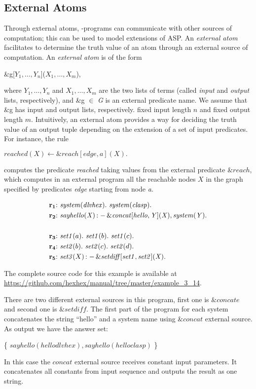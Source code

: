 \documentclass[a4paper, titlepage]{article}
\newcommand{\ext}[3]{\ensuremath{\&{#1}[#2](#3)}}
\DeclareMathOperator{\leftimpl}{:-}
\newcommand{\examplelink}[1]{\url{https://github.com/hexhex/manual/tree/master/#1}}
\newcommand\mycenterline[1]{\par\smallskip\centerline{#1} \smallskip}
\newcommand{\rowprefix}[1]{%
  \ensuremath{\color{black}\mathbf{#1{:}}\ }%
}
\begin{document}
\subsection{External Atoms}
\label{extatoms}
Through external atoms, \hex{}-programs can communicate 
with other sources of computation; this can be used to 
model extensions of ASP.  
An \emph{external atom} facilitates to determine the truth 
value of an atom through an external source of computation.
An \emph{external atom} is of the form
%
\mycenterline{ 
\&g[$Y_1,\dots,Y_n$]($X_1,\dots,X_m$),}
%
where $Y_1,
\dots,Y_n$ and $X_1,\dots,X_m$ are the two lists of terms 
(called \textit{input} and \textit{output} lists, 
respectively), and \&g $\in$ \textit{G} is an external 
predicate name. We assume that \&g has
input and output lists, respectively.%
fixed input length $n$ and fixed output length $m$. 
Intuitively, an 
external atom provides a way for deciding the truth value 
of an output tuple depending on the extension of a set of 
input predicates.
For instance, the rule 
%
\mycenterline{$reached(X) \leftarrow \&reach[edge,a](X).$}
%
computes the predicate \textit{reached} taking values 
from the external predicate $\&reach$, which computes in an external program
all the reachable nodes $X$ in 
the graph specified by predicates \textit{edge} starting from node \textit{a}. 
\begin{exmp}
\begin{align*}
\rowprefix{r_1}& \mathit{system}(\mathit{dlvhex}). \ 
\mathit{system}(\mathit{clasp}). \\  
\rowprefix{r_2}& \mathit{sayhello(X)} \leftimpl 
\ext{\mathit{concat}}{\mathit{hello, Y}}{\mathit{X}}, 
\mathit{system(Y).}  \\ 
\\
\rowprefix{r_3}& \mathit{set1}(a). \ \mathit{set1}(b). \ 
\mathit{set1}(c).\\
\rowprefix{r_4}& \mathit{set2}(b). \ \mathit{set2}(c). \ 
\mathit{set2}(d).\\
\rowprefix{r_5}& \mathit{set3}(X) \leftimpl 
\ext{\mathit{setdiff}}{\mathit{set1, set2}}{\mathit{X}}. 
\end{align*}
\end{exmp}
The complete source code for this example is available at \examplelink{example_3_14}.

There are two different external sources in this program, 
first one is $\mathit{\&concate}$ and second one is 
$\mathit{\&setdiff}$. The first part of the program for each 
system concatenates the string \enquote{hello} and a system 
name using $\mathit{\&concat}$ external source. As output 
we have the answer set:
%
\mycenterline{ \{ $\mathit{sayhello}(\mathit{hellodlvhex}), 
\mathit{sayhello}(\mathit{helloclasp})$ \}}
%
In this case the $\mathit{concat}$ external source receives 
constant input parameters. It concatenates all constants from input sequence and outputs the result as one string.
\end{document}
